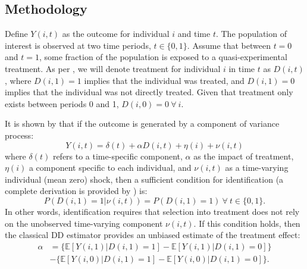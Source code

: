 \documentclass{article}
\begin{document}
\begin{spacing}{1.1}
\nocite{AngelucciDeGiorgi2009} \nocite{Heckmanetal1998}
\nocite{MiguelKremer2004}
 \nocite{Heckmanetal1998b}

\section{Methodology}
Define $Y(i,t)$ as the outcome for individual $i$ and time $t$.  The population
of interest is observed at two time periods, $t\in \{0,1\}$. Assume that between
$t=0$ and $t=1$, some fraction of the population is exposed to a 
quasi-experimental treatment.  As per \citet{Abadie2005}, we will denote 
treatment for individual $i$ in time $t$ as $D(i,t)$, where $D(i,1)=1$ implies 
that the individual was treated, and $D(i,1)=0$ implies that the individual was
not directly treated.  Given that treatment only exists between periods 0 and 1,
$D(i,0)=0\ \forall\ i$.

It is shown by \citet{AshenfelterCard1985} that if the outcome is generated by
a component of variance process:
\begin{equation}
\label{Seqn:COV}
Y(i,t)=\delta(t) + \alpha D(i,t)+\eta(i)+\nu(i,t)
\end{equation}
where $\delta(t)$ refers to a time-specific component, $\alpha$ as the impact of 
treatment, $\eta(i)$ a component specific to each individual, and $\nu(i,t)$ as 
a time-varying individual (mean zero) shock, then a sufficient condition for 
identification (a complete derivation is provided by \citet{Abadie2005}) is:
\begin{equation}
\label{Seqn:ID}
P(D(i,1)=1|\nu(i,t))=P(D(i,1)=1) \ \forall\ t\in\{0,1\}.
\end{equation}
In other words, identification requires that selection into treatment does not
rely on the unobserved time-varying component $\nu(i,t)$.  If this condition 
holds, then the classical DD estimator provides an unbiased estimate of the
treatment effect:
\begin{equation}
\label{Seqn:DD}
\begin{split}
\alpha&=\{\mathbb{E}[Y(i,1)|D(i,1)=1]-\mathbb{E}[Y(i,1)|D(i,1)=0]\} \\
      &-\{\mathbb{E}[Y(i,0)|D(i,1)=1]-\mathbb{E}[Y(i,0)|D(i,1)=0]\}.
\end{split}
\end{equation}


\end{spacing}
\end{document}
